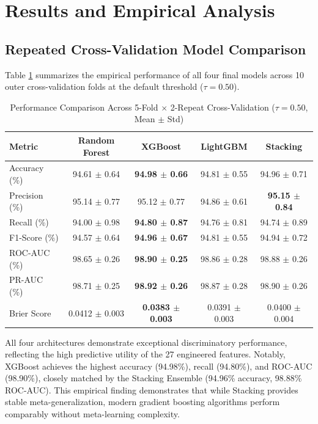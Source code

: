 \documentclass[conference]{IEEEtran}
\begin{document}
\section{Results and Empirical Analysis}

\subsection{Repeated Cross-Validation Model Comparison}
Table \ref{tab:model_comparison} summarizes the empirical performance of all four final models across 10 outer cross-validation folds at the default threshold ($\tau = 0.50$).

\begin{table}[htbp]
\centering
\caption{Performance Comparison Across 5-Fold $\times$ 2-Repeat Cross-Validation ($\tau=0.50$, Mean $\pm$ Std)}
\label{tab:model_comparison}
\begin{tabular}{lcccc}
\toprule
\textbf{Metric} & \textbf{Random Forest} & \textbf{XGBoost} & \textbf{LightGBM} & \textbf{Stacking} \\
\midrule
Accuracy (\%) & 94.61 $\pm$ 0.64 & \textbf{94.98 $\pm$ 0.66} & 94.81 $\pm$ 0.55 & 94.96 $\pm$ 0.71 \\
Precision (\%) & 95.14 $\pm$ 0.77 & 95.12 $\pm$ 0.77 & 94.86 $\pm$ 0.61 & \textbf{95.15 $\pm$ 0.84} \\
Recall (\%) & 94.00 $\pm$ 0.98 & \textbf{94.80 $\pm$ 0.87} & 94.76 $\pm$ 0.81 & 94.74 $\pm$ 0.89 \\
F1-Score (\%) & 94.57 $\pm$ 0.64 & \textbf{94.96 $\pm$ 0.67} & 94.81 $\pm$ 0.55 & 94.94 $\pm$ 0.72 \\
ROC-AUC (\%) & 98.65 $\pm$ 0.26 & \textbf{98.90 $\pm$ 0.25} & 98.86 $\pm$ 0.28 & 98.88 $\pm$ 0.26 \\
PR-AUC (\%) & 98.71 $\pm$ 0.25 & \textbf{98.92 $\pm$ 0.26} & 98.87 $\pm$ 0.28 & 98.90 $\pm$ 0.26 \\
Brier Score & 0.0412 $\pm$ 0.003 & \textbf{0.0383 $\pm$ 0.003} & 0.0391 $\pm$ 0.003 & 0.0400 $\pm$ 0.004 \\
\bottomrule
\end{tabular}
\end{table}

All four architectures demonstrate exceptional discriminatory performance, reflecting the high predictive utility of the 27 engineered features. Notably, XGBoost achieves the highest accuracy (94.98\%), recall (94.80\%), and ROC-AUC (98.90\%), closely matched by the Stacking Ensemble (94.96\% accuracy, 98.88\% ROC-AUC). This empirical finding demonstrates that while Stacking provides stable meta-generalization, modern gradient boosting algorithms perform comparably without meta-learning complexity.
\end{document}
